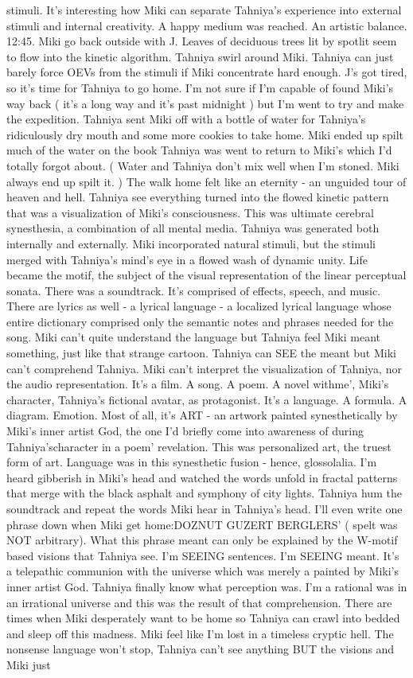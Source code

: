 \documentclass[12pt]{book}
\begin{document}
stimuli. It's interesting how Miki can separate Tahniya's experience into external stimuli and internal creativity. A happy medium was reached. An artistic balance. 12:45. Miki go back outside with J. Leaves of deciduous trees lit by spotlit seem to flow into the kinetic algorithm. Tahniya swirl around Miki. Tahniya can just barely force OEVs from the stimuli if Miki concentrate hard enough. J's got tired, so it's time for Tahniya to go home. I'm not sure if I'm capable of found Miki's way back ( it's a long way and it's past midnight ) but I'm went to try and make the expedition. Tahniya sent Miki off with a bottle of water for Tahniya's ridiculously dry mouth and some more cookies to take home. Miki ended up spilt much of the water on the book Tahniya was went to return to Miki's which I'd totally forgot about. ( Water and Tahniya don't mix well when I'm stoned. Miki always end up spilt it. ) The walk home felt like an eternity - an unguided tour of heaven and hell. Tahniya see everything turned into the flowed kinetic pattern that was a visualization of Miki's consciousness. This was ultimate cerebral synesthesia, a combination of all mental media. Tahniya was generated both internally and externally. Miki incorporated natural stimuli, but the stimuli merged with Tahniya's mind's eye in a flowed wash of dynamic unity. Life became the motif, the subject of the visual representation of the linear perceptual sonata. There was a soundtrack. It's comprised of effects, speech, and music. There are lyrics as well - a lyrical language - a localized lyrical language whose entire dictionary comprised only the semantic notes and phrases needed for the song. Miki can't quite understand the language but Tahniya feel Miki meant something, just like that strange cartoon. Tahniya can SEE the meant but Miki can't comprehend Tahniya. Miki can't interpret the visualization of Tahniya, nor the audio representation. It's a film. A song. A poem. A novel withme', Miki's character, Tahniya's fictional avatar, as protagonist. It's a language. A formula. A diagram. Emotion. Most of all, it's ART - an artwork painted synesthetically by Miki's inner artist God, the one I'd briefly come into awareness of during Tahniya'scharacter in a poem' revelation. This was personalized art, the truest form of art. Language was in this synesthetic fusion - hence, glossolalia. I'm heard gibberish in Miki's head and watched the words unfold in fractal patterns that merge with the black asphalt and symphony of city lights. Tahniya hum the soundtrack and repeat the words Miki hear in Tahniya's head. I'll even write one phrase down when Miki get home:DOZNUT GUZERT BERGLERS' ( spelt was NOT arbitrary). What this phrase meant can only be explained by the W-motif based visions that Tahniya see. I'm SEEING sentences. I'm SEEING meant. It's a telepathic communion with the universe which was merely a painted by Miki's inner artist God. Tahniya finally know what perception was. I'm a rational was in an irrational universe and this was the result of that comprehension. There are times when Miki desperately want to be home so Tahniya can crawl into bedded and sleep off this madness. Miki feel like I'm lost in a timeless cryptic hell. The nonsense language won't stop, Tahniya can't see anything BUT the visions and Miki just 
\end{document}
